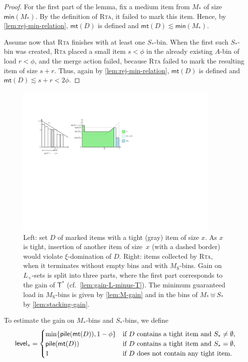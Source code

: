 \documentclass[a4paper,USenglish,cleveref]{lipics-v2019}
\newcommand{\M}{\ensuremath{M_\mathrm{S}}\xspace}
\newcommand{\A}{\ensuremath{A}\xspace}
\newcommand{\ST}{\ensuremath{S_*}\xspace}
\newcommand{\MT}{\ensuremath{M_*}\xspace}
\newcommand{\LT}{\ensuremath{L_+}\xspace}
\newcommand{\D}{\ensuremath{D}\xspace}
\newcommand{\smallBoundary}{\ensuremath{\phi}}
\newcommand{\g}{\ensuremath{\xi}}
\newcommand{\stack}{\textsf{pile}}
\newcommand{\level}{\textsf{level}_*}
\newcommand{\mn}{\textsf{min}}
\newcommand{\mt}{\textsf{mt}(\D)}
\newcommand{\T}{\textsf{T}}
\newcommand{\Tmax}{\T^*}
\newcommand{\ALG}{\textsc{Rta}\xspace}
\begin{document}
\begin{proof}
For the first part of the lemma, fix a medium item from \MT of size
$\mn(\MT)$. By the definition of \ALG, it failed to mark this item.
Hence, by \cref{lem:rej-min-relation}, $\mt$ is defined and $\mt \lesssim
\mn(\MT)$.

Assume now that \ALG finishes with at least one \ST-bin. When the first such
\ST-bin was created, \ALG placed a small item $s < \smallBoundary$ in the
already existing \A-bin of load $r < \smallBoundary$, and the merge action
failed, because \ALG failed to mark the resulting item of size $s+r$. Thus,
again by \cref{lem:rej-min-relation}, $\mt$ is defined and $\mt \lesssim s+r
< 2\smallBoundary$.
\end{proof}


\begin{figure}[t]
\centering
\includegraphics[width=0.9\textwidth]{images/tight-sets.pdf}
\caption{Left: set $\D$ of marked items with a tight (gray) item of size $x$. As
$x$ is tight, insertion of another item of size~$x$ (with a dashed border) would
violate $\g$-domination of $\D$. Right: items collected by \ALG, when it
terminates without empty bins and with $\M$-bins. Gain on $\LT$-sets is split
into three parts, where the first part corresponds to the gain of $\Tmax$
(cf.~\cref{lem:gain-L-minus-T}). The minimum guaranteed load 
in $\M$-bins is given by \cref{lem:M-gain} and in the bins of $\MT
\uplus \ST$ by \cref{lem:stacking-gain}.}
\label{fig:tightness}
\end{figure}

To estimate the gain on \MT-bins and \ST-bins, we define
\begin{equation}
\label{eq:level-def}
  \level = \begin{cases}
  \min\{ \stack(\mt), 1-\smallBoundary \} & \text{if \D contains a tight item and $\ST \neq \emptyset$,} \\
  \stack(\mt) & \text{if \D contains a tight item and $\ST = \emptyset$,} \\
  1 & \text{if \D does not contain any tight item.}
\end{cases}
\end{equation}
\end{document}
